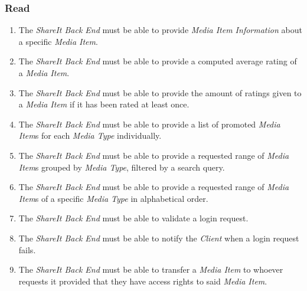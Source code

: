 

%

\noindent

\subsubsection{Read}
\begin{enumerate}[label=\textbf{FR-\twodigits*}, resume]

\item The \textit{ShareIt Back End} must be able to provide \textit{Media Item Information} about a specific \textit{Media Item}.

\item The \textit{ShareIt Back End} must be able to provide a computed average rating of a \textit{Media Item}.

\item The \textit{ShareIt Back End} must be able to provide the amount of ratings given to a \textit{Media Item} if it has been rated at least once.

\item The \textit{ShareIt Back End} must be able to provide a list of promoted \textit{Media Item}s for each \textit{Media Type} individually.

\item The \textit{ShareIt Back End} must be able to provide a requested range of \textit{Media Item}s grouped by \textit{Media Type}, filtered by a search query.

\item The \textit{ShareIt Back End} must be able to provide a requested range of \textit{Media Item}s of a specific \textit{Media Type} in alphabetical order.

\item The \textit{ShareIt Back End} must be able to validate a login request.

\item The \textit{ShareIt Back End} must be able to notify the \textit{Client} when a login request fails.

\item The \textit{ShareIt Back End} must be able to transfer a \textit{Media Item} to whoever requests it provided that they have access rights to said \textit{Media Item}.


\end{enumerate}

